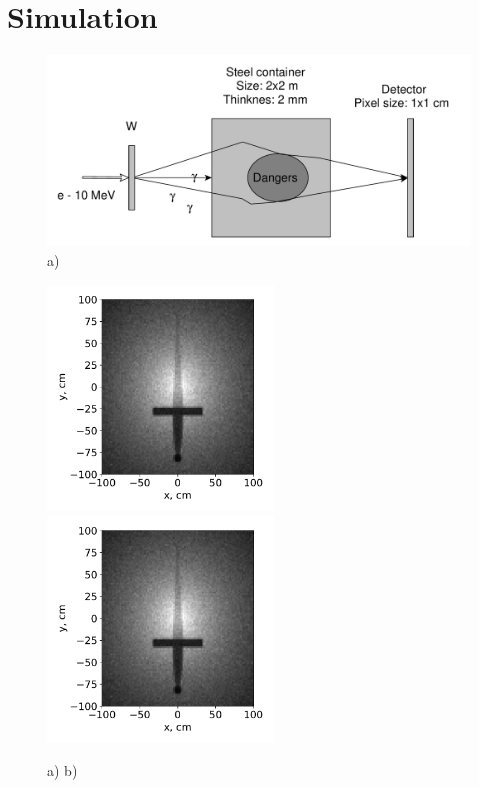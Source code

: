 \documentclass[a4paper]{panl}
\begin{document}
\section*{Simulation}
\begin{figure}[t]
    \begin{center}
        \includegraphics[width=120mm]{figures/yed_schema_1.pdf}  
        \vspace{-3mm}
        \caption{a) }
    \end{center}
    \vspace{-5mm}
\end{figure}
\begin{figure}[t]
    \begin{center}
        \includegraphics[width=60mm]{figures/Sword.pdf} 
        \includegraphics[width=60mm]{figures/Sword.pdf}  
        \vspace{-3mm}
        \caption{a) b)}
    \end{center}
    \vspace{-5mm}
\end{figure}
\end{document}
